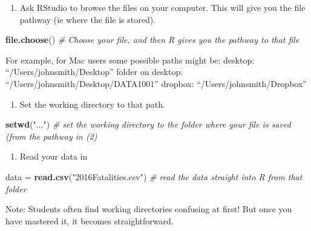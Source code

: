 \documentclass[]{article}
\newenvironment{Shaded}{\begin{snugshade}}{\end{snugshade}}
\newcommand{\CommentTok}[1]{\textcolor[rgb]{0.56,0.35,0.01}{\textit{#1}}}
\newcommand{\KeywordTok}[1]{\textcolor[rgb]{0.13,0.29,0.53}{\textbf{#1}}}
\newcommand{\NormalTok}[1]{#1}
\newcommand{\StringTok}[1]{\textcolor[rgb]{0.31,0.60,0.02}{#1}}
\providecommand{\tightlist}{%
  \setlength{\itemsep}{0pt}\setlength{\parskip}{0pt}}
\begin{document}
\begin{enumerate}
\def\labelenumi{(\arabic{enumi})}
\setcounter{enumi}{1}
\tightlist
\item
  Ask RStudio to browse the files on your computer. This will give you the file pathway (ie where the file is stored).
\end{enumerate}

\begin{Shaded}
\begin{Highlighting}[]
\KeywordTok{file.choose}\NormalTok{()  }\CommentTok{# Choose your file, and then R gives you the pathway to that file}
\end{Highlighting}
\end{Shaded}

For example, for Mac users some possible paths might be:
desktop: ``/Users/johnsmith/Desktop''
folder on desktop: ``/Users/johnsmith/Desktop/DATA1001''
dropbox: ``/Users/johnsmith/Dropbox''

\begin{enumerate}
\def\labelenumi{(\arabic{enumi})}
\setcounter{enumi}{2}
\tightlist
\item
  Set the working directory to that path.
\end{enumerate}

\begin{Shaded}
\begin{Highlighting}[]
\KeywordTok{setwd}\NormalTok{(}\StringTok{"..."}\NormalTok{) }\CommentTok{# set the working directory to the folder where your file is saved (from the pathway in (2)}
\end{Highlighting}
\end{Shaded}

\begin{enumerate}
\def\labelenumi{(\arabic{enumi})}
\setcounter{enumi}{3}
\tightlist
\item
  Read your data in
\end{enumerate}

\begin{Shaded}
\begin{Highlighting}[]
\NormalTok{data =}\StringTok{ }\KeywordTok{read.csv}\NormalTok{(}\StringTok{"2016Fatalities.csv"}\NormalTok{)  }\CommentTok{# read the data straight into R from that folder}
\end{Highlighting}
\end{Shaded}

Note: Students often find working directories confusing at first! But once you have mastered it, it becomes straightforward.
\end{document}
